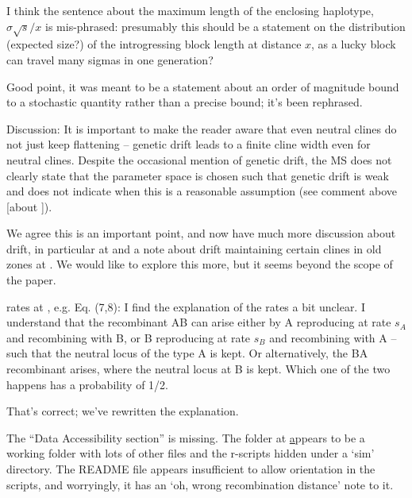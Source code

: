 \begin{point}{\revref}
 I think the sentence about the maximum length of the enclosing haplotype, $\sigma \sqrt{s} / x$ is mis-phrased: presumably this should be a statement on the distribution (expected size?) of the introgressing block length at distance $x$, as a lucky block can travel many sigmas in one generation?
\end{point}

\reply
Good point, it was meant to be a statement about an order of magnitude bound to a stochastic quantity rather than a precise bound; it's been rephrased.

\begin{point}{Discussion:}
    It is important to make the reader aware that even neutral clines do not just keep flattening -- genetic drift leads to a finite cline width even for neutral clines. Despite the occasional mention of genetic drift, the MS does not clearly state that the parameter space is chosen such that genetic drift is weak and does not indicate when this is a reasonable assumption (see comment above [about ]).
\end{point}

\reply
We agree this is an important point, and now have much more discussion about drift, in particular at \revref{}
and a note about drift maintaining certain clines in old zones at .
We would like to explore this more, but it seems beyond the scope of the paper.

\begin{point}{rates at \revref, e.g. Eq. (7,8):}
 I find the explanation of the rates a bit unclear. I understand that the recombinant AB can arise either by A reproducing at rate $s_A$ and recombining with B, or B reproducing at rate $s_B$ and recombining with A -- such that the neutral locus of the type A is kept. Or alternatively, the BA recombinant arises, where the neutral locus at B is kept. Which one of the two happens has a probability of 1/2.
\end{point}

\reply
That's correct; we've rewritten the explanation.

\begin{point}{}
The ``Data Accessibility section'' is missing. The folder at \href{http://github.com_petrelharp_clinal-lineages}  appears to be a working folder with lots of other files and the r-scripts hidden under a `sim' directory. The README file appears insufficient to allow orientation in the scripts, and worryingly, it has an `oh, wrong recombination distance' note to it.
\end{point}

